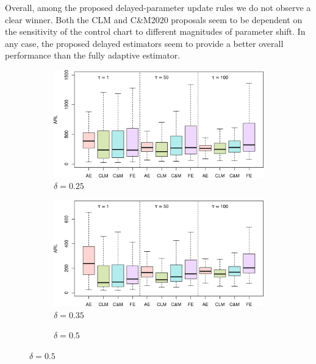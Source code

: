 Overall, among the proposed delayed-parameter update rules we do not observe a clear winner.
Both the CLM and C\&M2020 proposals seem to be dependent on the sensitivity of the control chart to different magnitudes of parameter shift.
In any case, the proposed delayed estimators seem to provide a better overall performance than the fully adaptive estimator.


\begin{figure}
\centering
\begin{subfigure}{0.49\textwidth}
  \centering
  \caption{$ \delta = 0.25$}
  \label{fig:lambda=0.05/theta=4.0/delta=0.25}
  \includegraphics[width=\textwidth]{img/sims/theta=4.0_signedEWMA(l = 0.05, upw = true, L = 1.0)/delta=0.25.png}
\end{subfigure}
\begin{subfigure}{0.49\textwidth}
  \centering
  \caption{$ \delta = 0.35$}
  \label{fig:lambda=0.05/theta=4.0/delta=0.35}
  \includegraphics[width=\textwidth]{img/sims/theta=4.0_signedEWMA(l = 0.05, upw = true, L = 1.0)/delta=0.35.png}
\end{subfigure}
\begin{subfigure}{0.49\textwidth}
  \centering
  \caption{$ \delta = 0.5$}

\end{subfigure}
\end{figure}
